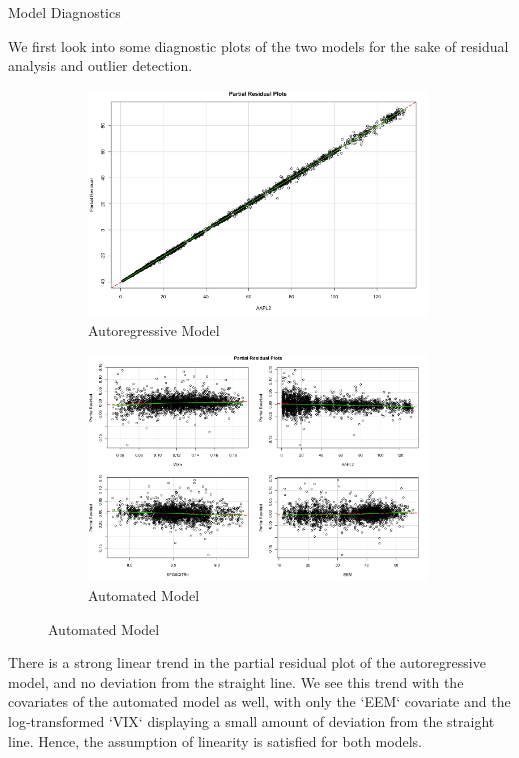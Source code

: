 \documentclass[]{article}
\begin{document}
\begin{section}{Model Diagnostics}

We first look into some diagnostic plots of the two models for the sake of residual analysis and outlier detection.

\begin{figure}[h]
\begin{subfigure}{.5\textwidth}
  \includegraphics[width=90mm]{diagnostics/arm_covar_residuals.png}
  \caption{Autoregressive Model}
\end{subfigure}%
\begin{subfigure}{.5\textwidth}
  \includegraphics[width=90mm]{diagnostics/fm_covar_residuals.png}
  \caption{Automated Model}
\end{subfigure}
\end{figure}

There is a strong linear trend in the partial residual plot of the autoregressive model, and no deviation from the straight line. We see this trend with the covariates of the automated model as well, with only the `EEM` covariate and the log-transformed `VIX` displaying a small amount of deviation from the straight line. Hence, the assumption of linearity is satisfied for both models.


\end{section}
\end{document}
